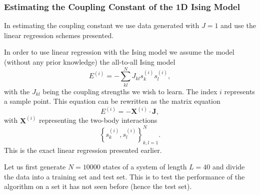 \documentclass[11pt]{article}
\begin{document}
\hypertarget{estimating-the-coupling-constant-of-the-1d-ising-model}{%
\subsubsection{Estimating the Coupling Constant of the 1D Ising
Model}\label{estimating-the-coupling-constant-of-the-1d-ising-model}}

In estimating the coupling constant we use data generated with \(J=1\)
and use the linear regression schemes presented.

In order to use linear regression with the Ising model we assume the
model (without any prior knowledge) the all-to-all Ising model
\[E^{(i)} = -\sum\limits_{kl}^NJ_{kl}s^{(i)}_ks^{(i)}_l,\] with the
\(J_{kl}\) being the coupling strengths we wish to learn. The index
\(i\) represents a sample point. This equation can be rewritten as the
matrix equation
\[E^{(i)} = -\boldsymbol{X}^{(i)} \cdot \boldsymbol{J},\] with
\(\boldsymbol{X}^{(i)}\) representing the two-body interactions
\[\left\{s^{(i)}_k,s^{(i)}_l\right\}_{k,l=1}^N.\] This is the exact
linear regression presented earlier.

Let us first generate \(N=10000\) states of a system of length \(L=40\)
and divide the data into a training set and test set. This is to test
the performance of the algorithm on a set it has not seen before (hence
the test set).
\end{document}
